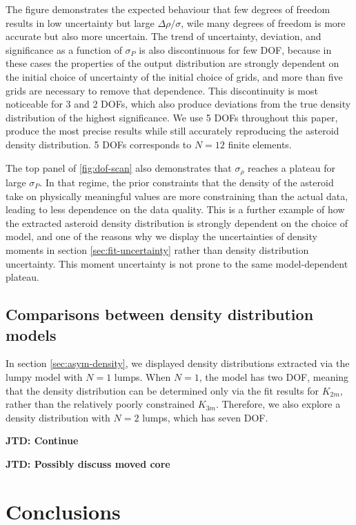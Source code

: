 \documentclass[fleqn,usenatbib]{mnras}
\newcommand{\jtd}[1]{ {\bf{\color{red} JTD: #1}} }
\begin{document}
The figure demonstrates the expected behaviour that few degrees of freedom results in low uncertainty but large $\Delta \rho / \sigma$, wile many degrees of freedom is more accurate but also more uncertain. The trend of uncertainty, deviation, and significance as a function of $\sigma_P$ is also discontinuous for few DOF, because in these cases the properties of the output distribution are strongly dependent on the initial choice of uncertainty of the initial choice of grids, and more than five grids are necessary to remove that dependence. This discontinuity is most noticeable for 3 and 2 DOFs, which also produce deviations from the true density distribution of the highest significance. We use 5 DOFs throughout this paper, produce the most precise results while still accurately reproducing the asteroid density distribution. 5 DOFs corresponds to $N=12$ finite elements.

The top panel of \ref{fig:dof-scan} also demonstrates that $\sigma_\rho$ reaches a plateau for large $\sigma_P$. In that regime, the prior constraints that the density of the asteroid take on physically meaningful values are more constraining than the actual data, leading to less dependence on the data quality. This is a further example of how the extracted asteroid density distribution is strongly dependent on the choice of model, and one of the reasons why we display the uncertainties of density moments in section \ref{sec:fit-uncertainty} rather than density distribution uncertainty. This moment uncertainty is not prone to the same model-dependent plateau.


\subsection{Comparisons between density distribution models}
\label{sec:density-compare}

In section \ref{sec:asym-density}, we displayed density distributions extracted via the lumpy model with $N=1$ lumps. When $N=1$, the model has two DOF, meaning that the density distribution can be determined only via the fit results for $K_{2m}$, rather than the relatively poorly constrained $K_{3m}$. Therefore, we also explore a density distribution with $N=2$ lumps, which has seven DOF.

\jtd{Continue}

\jtd{Possibly discuss moved core}

\section{Conclusions}
\end{document}
